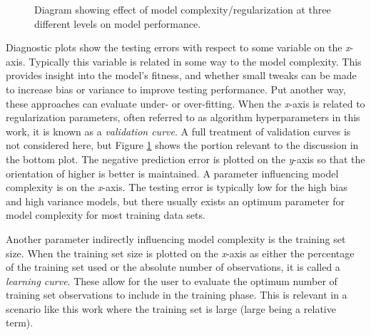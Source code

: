 \begin{figure}[!htb]
  \centering
  \caption[Diagram of model performance with respect to model complexity]
          {Diagram showing effect of model complexity/regularization at three 
           different levels on model performance.}
  \label{fig:complex}
\end{figure}

Diagnostic plots show the testing errors with respect to some variable on the
\textit{x}-axis.  Typically this variable is related in some way to the model
complexity. This provides insight into the model's fitness, and whether small
tweaks can be made to increase bias or variance to improve testing performance.
Put another way, these approaches can evaluate under- or over-fitting.  When
the \textit{x}-axis is related to regularization parameters, often referred to
as algorithm hyperparameters in this work, it is known as a \textit{validation
curve}. A full treatment of validation curves is not considered here, but
Figure \ref{fig:complex} shows the portion relevant to the discussion in the
bottom plot.  The negative prediction error is plotted on the \textit{y}-axis
so that the orientation of higher is better is maintained.  A parameter
influencing model complexity is on the \textit{x}-axis.  The testing error is
typically low for the high bias and high variance models, but there usually
exists an optimum parameter for model complexity for most training data sets. 

Another parameter indirectly influencing model complexity is the training set
size.  When the training set size is plotted on the \textit{x}-axis as either
the percentage of the training set used or the absolute number of observations,
it is called a \textit{learning curve}.  These allow for the user to evaluate
the optimum number of training set observations to include in the training
phase.  This is relevant in a scenario like this work where the training set is
large (large being a relative term).  


